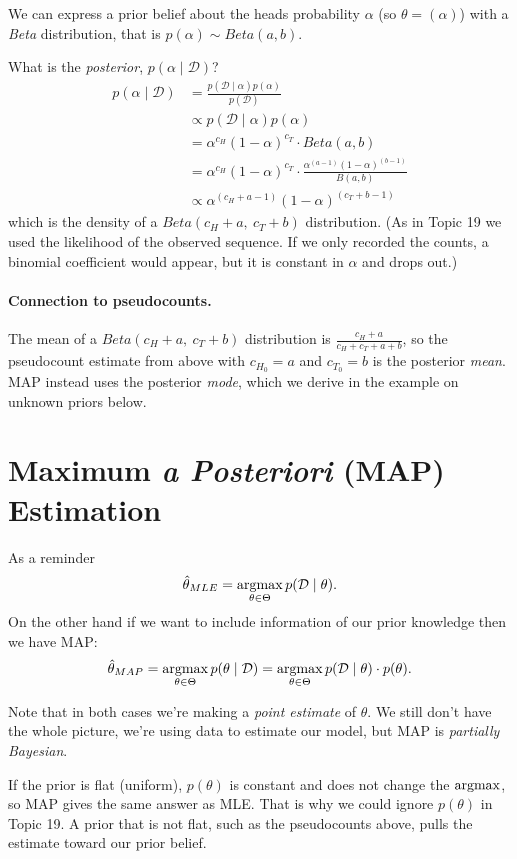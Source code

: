 We can express a prior belief about the heads probability $\alpha$ (so $\theta=(\alpha)$) with a \emph{Beta} distribution,
that is $p(\alpha)\sim Beta(a,b)$.

What is the \textit{posterior}, $p(\alpha\mid\mathcal{D})$? 
\begin{align*}
p(\alpha\mid\mathcal{D}) & = \frac{p(\mathcal{D}\mid\alpha)p(\alpha)}{p(\mathcal{D})}\\
				& \propto p(\mathcal{D}\mid\alpha)p(\alpha)\\
				& = \alpha^{c_H}(1-\alpha)^{c_T} \cdot Beta(a,b)\\
				& = \alpha^{c_H}(1-\alpha)^{c_T} \cdot \frac{\alpha^{(a-1)}(1-\alpha)^{(b-1)}}{B(a,b)}\\
				& \propto \alpha^{(c_H+a-1)}(1-\alpha)^{(c_T+b-1)}
\end{align*}
which is the density of a $Beta(c_H+a,\ c_T+b)$ distribution.
(As in Topic 19 we used the likelihood of the observed sequence. If we only recorded the counts, a binomial coefficient would appear, 
but it is constant in $\alpha$ and drops out.)

\paragraph{Connection to pseudocounts.} The mean of a $Beta(c_H+a,\ c_T+b)$ distribution is $\frac{c_H+a}{c_H+c_T+a+b}$, 
so the pseudocount estimate from above with $c_{H_0}=a$ and $c_{T_0}=b$ is the posterior \emph{mean}. 
MAP instead uses the posterior \emph{mode}, which we derive in the example on unknown priors below.

\section{Maximum \textit{a Posteriori} (MAP) Estimation}

As a reminder 
\[\hat\theta_{MLE} = \operatorname*{argmax}_{\theta\in\Theta} p(\mathcal{D}\mid \theta).\]
On the other hand if we want to include information of our prior knowledge 
then we have MAP:
\[\hat\theta_{MAP} = \operatorname*{argmax}_{\theta\in\Theta} p(\theta\mid\mathcal{D}) =  \operatorname*{argmax}_{\theta\in\Theta} p(\mathcal{D}\mid \theta)\cdot p(\theta).\]

Note that in both cases we're making a \emph{point estimate} of $\theta$. 
We still don't have the whole picture, we're using data to estimate our model, 
but MAP is \emph{partially Bayesian}.

If the prior is flat (uniform), $p(\theta)$ is constant and does not change the $\operatorname*{argmax}$, so MAP gives the same answer as MLE. 
That is why we could ignore $p(\theta)$ in Topic 19. A prior that is not flat, such as the pseudocounts above, pulls the estimate toward our prior belief. 


